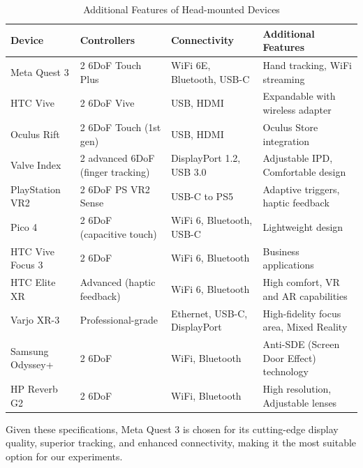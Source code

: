   \begin{table}[h!]
  \centering
  \begin{tabular}{|p{2.5cm}|p{3cm}|p{3cm}|p{5cm}|}
  \hline
  \textbf{Device} & \textbf{Controllers} & \textbf{Connectivity} & \textbf{Additional Features} \\ \hline
  Meta Quest 3 & 2 6DoF Touch Plus & WiFi 6E, Bluetooth, USB-C & Hand tracking, WiFi streaming \cite{metaQuest3} \\ \hline
  HTC Vive & 2 6DoF Vive & USB, HDMI & Expandable with wireless adapter \cite{htcVive} \\ \hline
  Oculus Rift & 2 6DoF Touch (1st gen) & USB, HDMI & Oculus Store integration \cite{oculusRift} \\ \hline
  Valve Index & 2 advanced 6DoF (finger tracking) & DisplayPort 1.2, USB 3.0 & Adjustable IPD, Comfortable design \cite{valveIndex} \\ \hline
  PlayStation VR2 & 2 6DoF PS VR2 Sense & USB-C to PS5 & Adaptive triggers, haptic feedback \cite{psVR2} \\ \hline
  Pico 4 & 2 6DoF (capacitive touch) & WiFi 6, Bluetooth, USB-C & Lightweight design \cite{pico4} \\ \hline
  HTC Vive Focus 3 & 2 6DoF & WiFi 6, Bluetooth & Business applications \cite{viveFocus3} \\ \hline
  HTC Elite XR & Advanced (haptic feedback) & WiFi 6, Bluetooth & High comfort, VR and AR capabilities \cite{eliteXR} \\ \hline
  Varjo XR-3 & Professional-grade & Ethernet, USB-C, DisplayPort & High-fidelity focus area, Mixed Reality \cite{varjoXR3} \\ \hline
  Samsung Odyssey+ & 2 6DoF & WiFi, Bluetooth & Anti-SDE (Screen Door Effect) technology \cite{odysseyPlus} \\ \hline
  HP Reverb G2 & 2 6DoF & WiFi, Bluetooth & High resolution, Adjustable lenses \cite{reverbG2} \\ \hline
  \end{tabular}
  \caption{Additional Features of Head-mounted Devices}
  \label{table:additional_features}
  \end{table}
  
  \clearpage %
  


Given these specifications, Meta Quest 3 is chosen for its cutting-edge display quality, superior tracking, and enhanced connectivity, making it the most suitable option for our experiments. 

